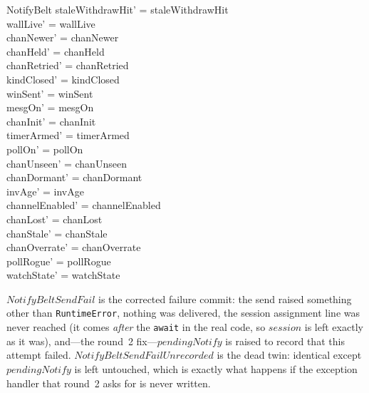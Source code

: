 \documentclass[a4paper,10pt,fleqn]{article}
\begin{document}
\begin{schema}{NotifyBelt}
  staleWithdrawHit' = staleWithdrawHit \\
  wallLive' = wallLive \\
  chanNewer' = chanNewer \\
  chanHeld' = chanHeld \\
  chanRetried' = chanRetried \\
  kindClosed' = kindClosed \\
  winSent' = winSent \\
  mesgOn' = mesgOn \\
  chanInit' = chanInit \\
  timerArmed' = timerArmed \\
  pollOn' = pollOn \\
  chanUnseen' = chanUnseen \\
  chanDormant' = chanDormant \\
  invAge' = invAge \\
  channelEnabled' = channelEnabled \\
  chanLost' = chanLost \\
  chanStale' = chanStale \\
  chanOverrate' = chanOverrate \\
  pollRogue' = pollRogue \\
  watchState' = watchState
\end{schema}

$NotifyBeltSendFail$ is the corrected failure commit: the send raised
something other than \texttt{RuntimeError}, nothing was delivered, the
session assignment line was never reached (it comes \emph{after} the
\texttt{await} in the real code, so $session$ is left exactly as it
was), and---the round~2 fix---$pendingNotify$ is raised to record that
this attempt failed.  $NotifyBeltSendFailUnrecorded$ is the dead twin:
identical except $pendingNotify$ is left untouched, which is exactly
what happens if the exception handler that round~2 asks for is never
written.
\end{document}
